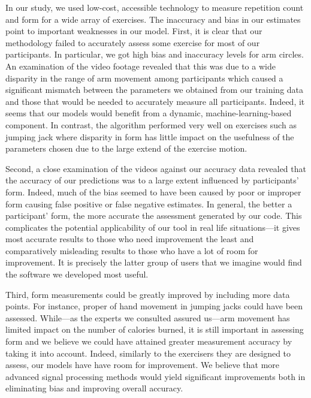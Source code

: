 In our study, we used low-cost, accessible technology to measure repetition count and form for a wide array of exercises. The inaccuracy and bias in our estimates point to important weaknesses in our model. 
First, it is clear that our methodology failed to accurately assess some exercise for most of our participants.
In particular, we got high bias and inaccuracy levels for arm circles.
An examination of the video footage revealed that this was due to a wide disparity in the range of arm movement among participants which caused a significant mismatch between the parameters we obtained from our training data and those that would be needed to accurately measure all participants. Indeed, it seems that our models would benefit from a dynamic, machine-learning-based component.
In contrast, the algorithm performed very well on exercises such as jumping jack where disparity in form has little impact on the usefulness of the parameters chosen due to the large extend of the exercise motion.

Second, a close examination of the videos against our accuracy data revealed that 
the accuracy of our predictions was to a large extent influenced by participants' form.
Indeed, much of the bias seemed to have been caused by poor or improper form causing false positive or false negative estimates.
In general, the better a participant' form, the more accurate the assessment generated by our code. 
This complicates the potential applicability of our tool in real life situations---it gives most accurate results to those who need improvement the least and comparatively misleading results to those who have a lot of room for improvement. It is precisely the latter group of users that we imagine would find the software we developed most useful. 

Third, form measurements could be greatly improved by including more data points.
For instance, proper of hand movement in jumping jacks could have been assessed.
While---as the experts we consulted assured us---arm movement has limited impact on the number of calories burned, it is still important in assessing form and we believe we could have attained greater measurement accuracy by taking it into account. 
Indeed, similarly to the exercisers they are designed to assess, our models have have room for improvement. We believe that more advanced signal processing methods would yield significant improvements both in eliminating bias and improving overall accuracy.